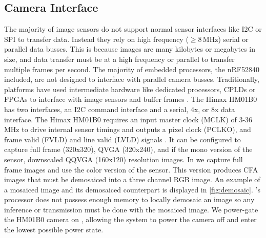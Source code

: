 \subsection{Camera Interface}
The majority of image sensors do not support normal sensor interfaces like I2C or SPI to transfer data. Instead they rely on high frequency ($\geq$8\,MHz) serial or parallel data busses. This is because images are many kilobytes or megabytes in size, and data transfer must be at a high frequency or parallel to transfer multiple frames per second. The majority of embedded processors, the nRF52840 included, are not designed to interface with parallel camera busses. Traditionally, platforms have used intermediate hardware like dedicated processors, CPLDs or FPGAs to interface with image sensors and buffer frames \cite{rowe2007firefly,rahimi2005cyclops}. The Himax HM01B0 has two interfaces, an I2C command interface and a serial, 4x, or 8x data interface.
The Himax HM01B0 requires an input master clock (MCLK) of 3-36\,MHz to drive internal sensor timings and outputs a pixel clock (PCLKO), and frame valid (FVLD) and line valid (LVLD) signals \cite{hm01b0}. It can be configured to capture full frame (320x320), QVGA (320x240), and if the mono version of the sensor, downscaled QQVGA (160x120) resolution images. In \name{} we capture full frame images and use the color version of the sensor. This version produces CFA images that must be demosaiced into a three channel RGB image. An example of a mosaiced image and its demosaiced counterpart is displayed in \cref{fig:demosaic}. \name{}'s processor does not possess enough memory to locally demosaic an image so any inference or transmission must be done with the mosaiced image. We power-gate the HM01B0 camera on \name, allowing the system to power the camera off and enter the lowest possible power state.


